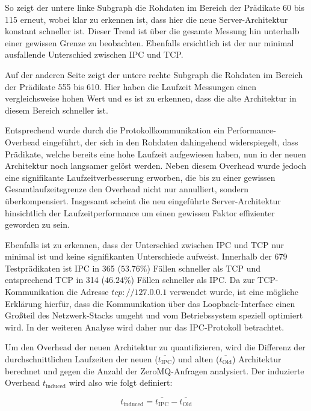 So zeigt der untere linke Subgraph die Rohdaten im Bereich der Prädikate 60 bis 115 erneut,
wobei klar zu erkennen ist, dass hier die neue Server-Architektur konstant schneller ist.
Dieser Trend ist über die gesamte Messung hin unterhalb einer gewissen Grenze zu beobachten.
Ebenfalls ersichtlich ist der nur minimal ausfallende Unterschied zwischen IPC und TCP.

Auf der anderen Seite zeigt der untere rechte Subgraph die Rohdaten im Bereich der Prädikate 555 bis 610.
Hier haben die Laufzeit Messungen einen vergleichsweise hohen Wert und es ist zu erkennen,
dass die alte Architektur in diesem Bereich schneller ist. 

Entsprechend wurde durch die Protokollkommunikation ein Performance-Overhead eingeführt, der sich in den Rohdaten dahingehend widerspiegelt,
dass Prädikate, welche bereits eine hohe Laufzeit aufgewiesen haben, nun in der neuen Architektur noch langsamer gelöst werden.
Neben diesem Overhead wurde jedoch eine signifikante Laufzeitverbesserung erworben, die bis zu einer gewissen Gesamtlaufzeitsgrenze den
Overhead nicht nur annulliert, sondern überkompensiert.
Insgesamt scheint die neu eingeführte Server-Architektur hinsichtlich der Laufzeitperformance um einen gewissen Faktor effizienter geworden zu sein.

Ebenfalls ist zu erkennen, dass der Unterschied zwischen IPC und TCP nur minimal ist und keine signifikanten Unterschiede aufweist.
Innerhalb der 679 Testprädikaten ist IPC in 365 ($53.76\%$) Fällen schneller als TCP und entsprechend TCP in 314 ($46.24\%$) Fällen schneller als IPC.
Da zur TCP-Kommunikation die Adresse  $tcp://127.0.0.1$ verwendet wurde, ist eine mögliche Erklärung hierfür, dass die Kommunikation über das Loopback-Interface
einen Großteil des Netzwerk-Stacks umgeht und vom Betriebssystem speziell optimiert wird.
In der weiteren Analyse wird daher nur das IPC-Protokoll betrachtet.

\clearpage

Um den Overhead der neuen Architektur zu quantifizieren,
wird die Differenz der durchschnittlichen Laufzeiten der neuen ($\overline{t_\text{IPC}}$) und alten ($\overline{t_\text{Old}}$) Architektur berechnet
und gegen die Anzahl der ZeroMQ-Anfragen analysiert.
Der induzierte Overhead $t_\text{induced}$ wird also wie folgt definiert:

\begin{equation}
    t_\text{induced} = \overline{t_\text{IPC}} - \overline{t_\text{Old}}
\end{equation}

